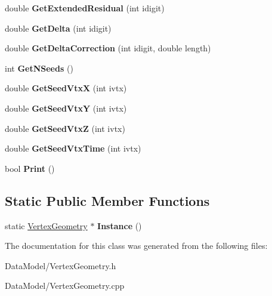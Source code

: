 \begin{DoxyCompactItemize}
\item 
\hypertarget{classVertexGeometry_a1468313e8d597296ea38a7ea593b286b}{double {\bfseries Get\-Extended\-Residual} (int idigit)}\label{classVertexGeometry_a1468313e8d597296ea38a7ea593b286b}

\item 
\hypertarget{classVertexGeometry_ad4284adc79b1135771c00181ee45e943}{double {\bfseries Get\-Delta} (int idigit)}\label{classVertexGeometry_ad4284adc79b1135771c00181ee45e943}

\item 
\hypertarget{classVertexGeometry_a9879da406fa81cc2216c586c57f6aff9}{double {\bfseries Get\-Delta\-Correction} (int idigit, double length)}\label{classVertexGeometry_a9879da406fa81cc2216c586c57f6aff9}

\item 
\hypertarget{classVertexGeometry_a3ae6ead6c902cd6afa16eff62d2e7fbc}{int {\bfseries Get\-N\-Seeds} ()}\label{classVertexGeometry_a3ae6ead6c902cd6afa16eff62d2e7fbc}

\item 
\hypertarget{classVertexGeometry_a61e40675ff74d059d33f7caecd9c5119}{double {\bfseries Get\-Seed\-Vtx\-X} (int ivtx)}\label{classVertexGeometry_a61e40675ff74d059d33f7caecd9c5119}

\item 
\hypertarget{classVertexGeometry_a4cb1136b60514d74afce0baed5a59a5e}{double {\bfseries Get\-Seed\-Vtx\-Y} (int ivtx)}\label{classVertexGeometry_a4cb1136b60514d74afce0baed5a59a5e}

\item 
\hypertarget{classVertexGeometry_adc04b17f41f7bf2d1019bf2a4047e18f}{double {\bfseries Get\-Seed\-Vtx\-Z} (int ivtx)}\label{classVertexGeometry_adc04b17f41f7bf2d1019bf2a4047e18f}

\item 
\hypertarget{classVertexGeometry_a297e42e770f0e8222b567ec279d5b910}{double {\bfseries Get\-Seed\-Vtx\-Time} (int ivtx)}\label{classVertexGeometry_a297e42e770f0e8222b567ec279d5b910}

\item 
\hypertarget{classVertexGeometry_abbbb887e514513a93a82c183918ea140}{bool {\bfseries Print} ()}\label{classVertexGeometry_abbbb887e514513a93a82c183918ea140}

\end{DoxyCompactItemize}
\subsection*{Static Public Member Functions}
\begin{DoxyCompactItemize}
\item 
\hypertarget{classVertexGeometry_aabc5f26abc1c7f40688a03c01d6ec22d}{static \hyperlink{classVertexGeometry}{Vertex\-Geometry} $\ast$ {\bfseries Instance} ()}\label{classVertexGeometry_aabc5f26abc1c7f40688a03c01d6ec22d}

\end{DoxyCompactItemize}


The documentation for this class was generated from the following files\-:\begin{DoxyCompactItemize}
\item 
Data\-Model/Vertex\-Geometry.\-h\item 
Data\-Model/Vertex\-Geometry.\-cpp\end{DoxyCompactItemize}
